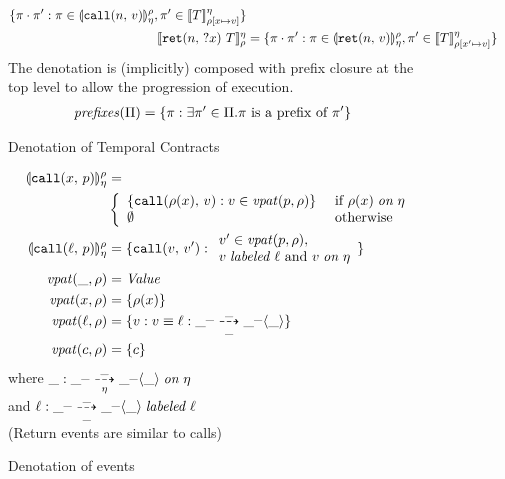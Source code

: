 \begin{figure}
\begin{align*}
   \setbuild{\mtrace \cdot \mtrace'}
            {\mtrace \in \denoteevent{\scallev{\mname}{\mval}}{\mtimeline}{\menv},
             \mtrace' \in \denotetcon{\mtcon}{\mtimeline}{\menv[\mvar \mapsto \mval]}}
\\
   \denotetcon{\stret{\mname}{\mvar}{\mtcon}}{\mtimeline}{\menv} &=
   \setbuild{\mtrace\cdot \mtrace'}
            {\mtrace \in \denoteevent{\sretev{\mname}{\mval}}{\mtimeline}{\menv},
             \mtrace' \in \denotetcon{\mtcon}{\mtimeline}{\menv[\mvar' \mapsto \mval]}}
  \end{align*}
  The denotation is (implicitly) composed with prefix closure at the top level to allow the progression of execution.
  \begin{align*}
    \mathit{prefixes}(\Pi) &= \{\pi : \exists \pi' \in \Pi. \pi \text{ is a prefix of } \pi'\}
  \end{align*}
  \caption{Denotation of Temporal Contracts}
  \label{fig:tcontract-denotation}
\end{figure}

\begin{figure}
  \begin{align*}
    \llparenthesis {\tt call}(x,\, p) \rrparenthesis_{\eta}^{\rho} &= \\
    &\left\{\begin{array}{ll}
           \{{\tt call}(\rho(x),\,v) : v \in \mathit{vpat}(p, \rho)\} &\text{ if } \rho(x) \mathrel{\mathit{on}} \eta \\
           \emptyset & \text{ otherwise}
           \end{array}\right.
\\
    \llparenthesis {\tt call}(\ell,\, p) \rrparenthesis_{\eta}^{\rho} &=
      \{{\tt call}(v,\,v') : 
        \begin{array}{l}
v' \in \mathit{vpat}(p, \rho),\\
 v \mathrel{\mathit{labeled}} \ell \text{ and } v \mathrel{\mathit{on}} \eta
\end{array}
\}
\\
   \mathit{vpat}(\_, \rho) &= \mathit{Value}
\\
   \mathit{vpat}(x, \rho) &= \{\rho(x)\}
\\
   \mathit{vpat}(\ell, \rho) &= \{v : v \equiv \ell : \_^{\_} \overset{\_}{\underset{\_}{\dashrightarrow}} \_^{\_} \langle\_\rangle\}
\\
   \mathit{vpat}(c, \rho) &= \{c\}
  \end{align*}
  where $\_ : \_^{\_} \overset{\_}{\underset{\eta}{\dashrightarrow}} \_^{\_} \langle\_\rangle \mathrel{\mathit{on}} \eta$ \\
  and $\ell : \_^{\_} \overset{\_}{\underset{\_}{\dashrightarrow}} \_^{\_} \langle\_\rangle \mathrel{\mathit{labeled}} \ell$ \\
  (Return events are similar to calls)
  \caption{Denotation of events}
  \label{fig:event-denotation}
\end{figure}

